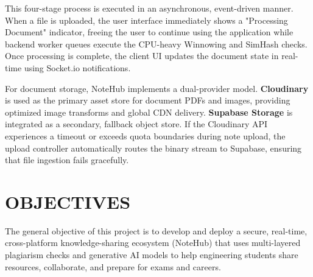 \documentclass[12,Times new Roman,a4paper]{report}
\begin{document}
This four-stage process is executed in an asynchronous, event-driven manner. When a file is uploaded, the user interface immediately shows a "Processing Document" indicator, freeing the user to continue using the application while backend worker queues execute the CPU-heavy Winnowing and SimHash checks. Once processing is complete, the client UI updates the document state in real-time using Socket.io notifications.

For document storage, NoteHub implements a dual-provider model. \textbf{Cloudinary} is used as the primary asset store for document PDFs and images, providing optimized image transforms and global CDN delivery. \textbf{Supabase Storage} is integrated as a secondary, fallback object store. If the Cloudinary API experiences a timeout or exceeds quota boundaries during note upload, the upload controller automatically routes the binary stream to Supabase, ensuring that file ingestion fails gracefully.

\section{OBJECTIVES}

The general objective of this project is to develop and deploy a secure, real-time, cross-platform knowledge-sharing ecosystem (NoteHub) that uses multi-layered plagiarism checks and generative AI models to help engineering students share resources, collaborate, and prepare for exams and careers.
\end{document}
